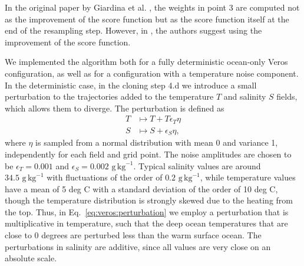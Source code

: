 In the original paper by Giardina et al. \cite{GIA11}, the weights in point 3 are computed not as the improvement of the score function but as the score function itself at the end of the resampling step. However, in \cite{GAR06}, the authors suggest using the improvement of the score function.

We implemented the algorithm both for a fully deterministic ocean-only Veros configuration, as well as for a configuration with a temperature noise component. In the deterministic case, in the cloning step 4.d we introduce a small perturbation to the trajectories added to the temperature $T$ and salinity $S$ fields, which allows them to diverge. The perturbation is defined as
\begin{equation}\label{eq:veros:perturbation}
    \begin{aligned}
        T &\mapsto T + T\epsilon_T \eta \\
        S &\mapsto S + \epsilon_S \eta ,
    \end{aligned}
\end{equation}
where $\eta$ is sampled from a normal distribution with mean 0 and variance 1, independently for each field and grid point. The noise amplitudes are chosen to be $\epsilon_T = 0.001$ and $\epsilon_S = 0.002 \,\, \text{g} \, \text{kg}^{-1}$. Typical salinity values are around $34.5 \,\, \text{g} \, \text{kg}^{-1}$ with fluctuations of the order of $0.2 \,\, \text{g} \, \text{kg}^{-1}$, while temperature values have a mean of 5 deg C with a standard deviation of the order of 10 deg C, though the temperature distribution is strongly skewed due to the heating from the top. Thus, in Eq.~\ref{eq:veros:perturbation} we employ a perturbation that is multiplicative in temperature, such that the deep ocean temperatures that are close to 0 degrees are perturbed less than the warm surface ocean. The perturbations in salinity are additive, since all values are very close on an absolute scale.




